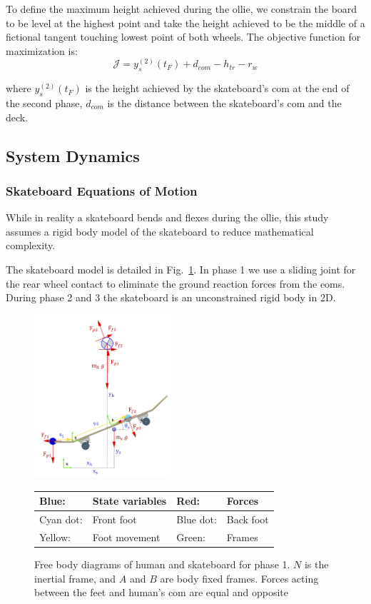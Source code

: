 \documentclass[default,iicol]{sn-jnl}
\begin{document}
To  define the maximum height achieved during the ollie, we constrain the board to be level at the highest point and
take the height achieved to be the middle of a fictional tangent touching lowest point of both wheels. The objective function for maximization is:
%
\begin{equation}
  \mathcal{J} = y_s^{(2)}(t_F) + d_{com} - h_{tr} - r_w
\end{equation}

\noindent where $y_s^{(2)}(t_F)$ is the height achieved by the skateboard's \gls{com} at the end of the second phase, $d_{com}$ is the distance between the skateboard's \gls{com} and the deck.

\subsection{System Dynamics}\label{s_systemdynamics}

\subsubsection{Skateboard Equations of Motion}
While in reality a skateboard bends and flexes during the ollie, this study assumes a rigid body model of the skateboard to reduce mathematical complexity.

The skateboard model is detailed in Fig.~\ref{fig:FBD}. In phase 1 we use a sliding joint for the rear wheel contact to eliminate the ground reaction forces from the \glspl{eom}.
During phase 2 and 3 the skateboard is an unconstrained rigid body in 2D. 

\begin{figure}
    \centering
    \includegraphics[width=0.45\textwidth]{figure/FBD_skater_feet.png}
    \footnotesize\begin{tabular}{|l l|l l|} \hline
    \color{blue}Blue: & State variables &\color{red} Red: & Forces \\ \hline
    \color{cyan}Cyan dot: & Front foot & \color{blue}Blue dot: & Back foot \\ \hline
    \color{yellow}Yellow: & Foot movement & \color{green}Green: & Frames \\ \hline
    \end{tabular}
    \caption[Free Body Diagrams phase 2 and 3]{Free body diagrams of human and skateboard for phase 1. $N$ is the inertial frame, and $A$ and $B$ are body fixed frames. Forces acting between the feet and human's \gls{com} are equal and opposite}
    \label{fig:FBD}
\end{figure}
\end{document}
